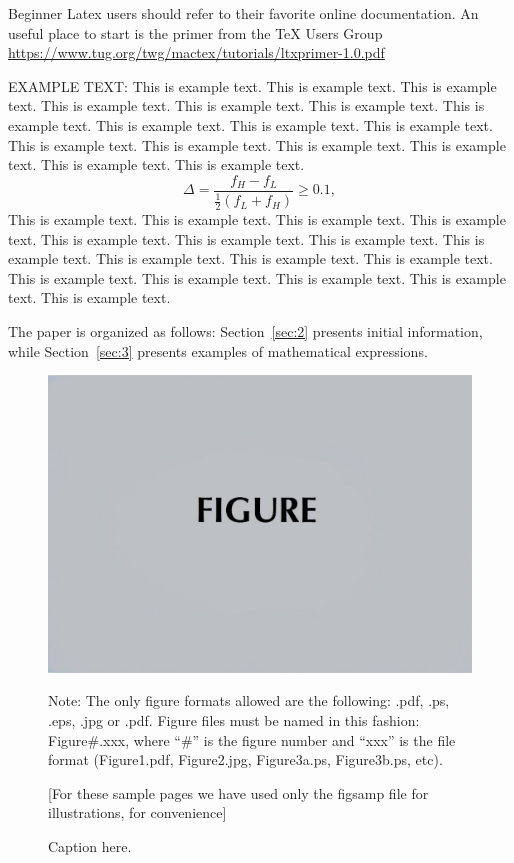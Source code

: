 \documentclass{JASA-EL}
\begin{document}
  Beginner Latex users should refer to their favorite online
  documentation. An
  useful place to start is the primer from the TeX Users Group 
  \url{https://www.tug.org/twg/mactex/tutorials/ltxprimer-1.0.pdf}


EXAMPLE TEXT: 
This is example text. This is example text. This is example text. This
is example text. This is example text. This is example text. This is
example text. This is example text. This is example text. This is
example text. This is example text. This is example text. This is
example text. This is example text. This is example text. This is
example text.
\begin{equation}
\Delta = \frac{f_H - f_L}{\frac{1}{2}(f_L + f_H)} \geq 0.1,
\end{equation}
This is example text. This is example text. This is example text. This
is example text. This is example text. This is example text. This is
example text. This is example text. This is example text. This is
example text. This is example text. This is example text. This is
example text. This is example text. This is example text. This is
example text.

The paper is organized as follows: Section~\ref{sec:2} presents
initial information, while
Section~\ref{sec:3} presents examples of mathematical expressions.

 
\begin{figure}[ht]
\includegraphics[width=\reprintcolumnwidth]{figsamp}
\caption{\label{fig:FIG1}{Caption here.}}

\raggedright
Note: The only figure formats allowed are the following: 
.pdf, .ps, .eps, .jpg or .pdf. Figure files must be named in this fashion:
Figure\#.xxx, where ``\#'' is the figure number and ``xxx'' is the file format
(Figure1.pdf, Figure2.jpg, Figure3a.ps, Figure3b.ps, etc). 

[For these sample pages we have used only the figsamp file for
illustrations, for convenience]
\end{figure}
\end{document}
